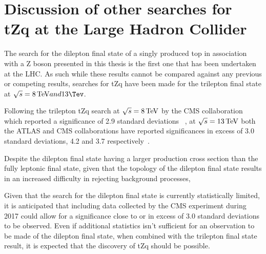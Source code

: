 \section{Discussion of other searches for tZq at the Large Hadron Collider}
The search for the dilepton final state of a singly produced top in association with a Z boson presented in this thesis is the first one that has been undertaken at the LHC.
As such while these results cannot be compared against any previous or competing results, searches for tZq have been made for the trilepton final state at $\sqrt{s} = 8 \TeV and 13 \Tev$.

Following the trilepton tZq search at $\sqrt{s} = 8 \,\text{Te\hspace{-.08em}V}$ by the CMS collaboration which reported a significance of 2.9 standard deviations ~\cite{Sirunyan:2017kkr}, at $\sqrt{s} = 13 \,\text{Te\hspace{-.08em}V}$ both the ATLAS and CMS collaborations  have reported significances in excess of 3.0 standard deviations, 4.2 and 3.7 respectively~\cite{Aaboud:2017ylb,Sirunyan:2017nbr}.

Despite the dilepton final state having a larger production cross section than the fully leptonic final state, given that the topology of the dilepton final state results in an increased difficulty in rejecting background processes, 


Given that the search for the dilepton final state is currently statistically limited, it is anticipated that including data collected by the CMS experiment during 2017 could allow for a significance close to or in excess of 3.0 standard deviations to be observed.
Even if additional statistics isn't sufficient for an observation to be made of the dilepton final state, when combined with the trilepton final state result, it is expected that the discovery of tZq should be possible.